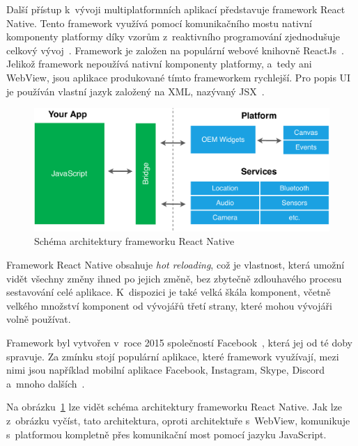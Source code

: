 Další přístup k~vývoji multiplatformních aplikací představuje framework
React Native.
Tento framework využívá pomocí komunikačního mostu nativní komponenty platformy
díky vzorům z~reaktivního programování zjednodušuje celkový
vývoj~\cite{hackernoon_flutter}.
Framework je založen na populární webové
knihovně ReactJs~\cite{dashmagazine_mobile_frameworks}.
Jelikož framework nepoužívá nativní komponenty platformy,
a~tedy ani WebView,
jsou aplikace produkované tímto frameworkem
rychlejší.
Pro popis UI je používán vlastní jazyk založený na XML,
nazývaný JSX~\cite{dashmagazine_mobile_frameworks}.

\begin{figure}
    \centering
    \includegraphics[width=\linewidth]{assets/technology-research/framework/react_native.pdf}
    \caption{Schéma architektury frameworku React Native~\cite{hackernoon_flutter}}
    \label{fig:framework_react_native}
\end{figure}

Framework React Native obsahuje \emph{hot reloading},
což je vlastnost,
která umožní vidět všechny změny ihned po jejich změně,
bez zbytečně zdlouhavého procesu sestavování celé aplikace.
K~dispozici je také velká škála komponent,
včetně velkého množství komponent od vývojářů třetí strany, 
které mohou vývojáři volně používat.~\cite{dashmagazine_mobile_frameworks}

Framework byl vytvořen v~roce 2015
společností Facebook~\cite{hackernoon_flutter},
která jej od té doby spravuje.
Za zmínku stojí populární aplikace,
které framework využívají,
mezi nimi jsou například mobilní aplikace Facebook, Instagram, Skype, Discord
a~mnoho dalších~\cite{react_native}.

Na obrázku~\ref{fig:framework_react_native} lze vidět schéma architektury
frameworku React Native.
Jak lze z~obrázku vyčíst,
tato architektura,
oproti architektuře s~WebView,
komunikuje s~platformou kompletně přes komunikační most pomocí jazyku
JavaScript.

